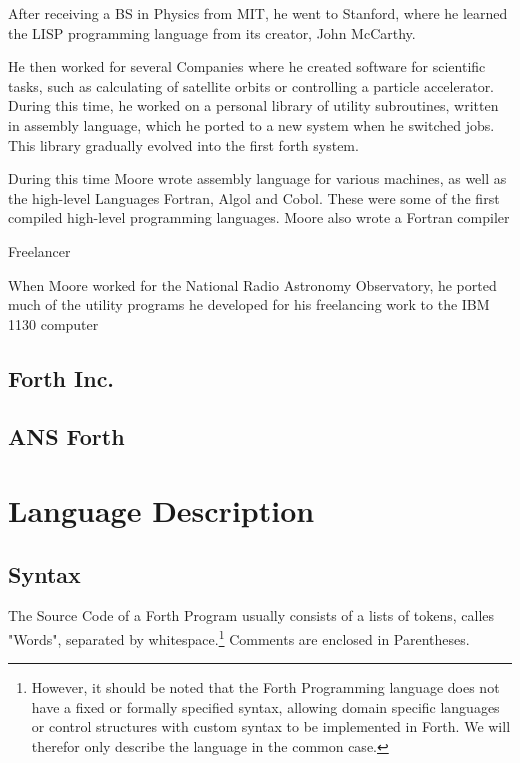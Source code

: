 \documentclass{llncs}
\begin{document}
After receiving a BS in Physics from MIT, he went to Stanford, where he learned the LISP programming language from its creator, John McCarthy. \cite{chuckbio}

He then worked for several Companies where he created software for scientific tasks, such as calculating of satellite orbits or controlling a particle accelerator. During this time, he worked on a personal library of utility subroutines, written in assembly language, which he ported to a new system when he switched jobs. This library gradually evolved into the first forth system.

During this time Moore wrote assembly language for various machines, as well as the high-level Languages Fortran, Algol and Cobol. These were some of the first compiled high-level programming languages. Moore also wrote a Fortran compiler

Freelancer

When Moore worked for the National Radio Astronomy Observatory, he ported much of the utility programs he developed for his freelancing work to the IBM 1130 computer

 
\subsection{Forth Inc.}

\subsection{ANS Forth}

\section{Language Description}
\subsection{Syntax}
The Source Code of a Forth Program usually consists of a lists of tokens, calles "Words", separated by whitespace.\footnote{However, it should be noted that the Forth Programming language does not have a fixed or formally specified syntax, allowing domain specific languages or control structures with custom syntax to be implemented in Forth. We will therefor only describe the language in the common case.} Comments are enclosed in Parentheses.
\end{document}
